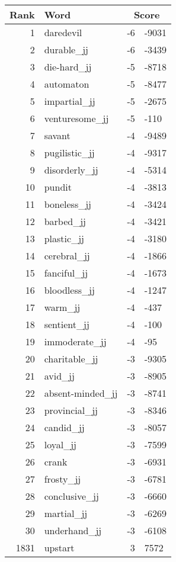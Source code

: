 \begin{longtable}[!htbp]{| rlr@{.}l |}
    \hline
    \textbf{Rank} & \textbf{Word} & \multicolumn{2}{c|}{\textbf{Score}} \\
    \hline
    \endhead
    1 & daredevil & -6 & -9031 \\
    2 & durable\_jj & -6 & -3439 \\
    3 & die-hard\_jj & -5 & -8718 \\
    4 & automaton & -5 & -8477 \\
    5 & impartial\_jj & -5 & -2675 \\
    6 & venturesome\_jj & -5 & -110 \\
    7 & savant & -4 & -9489 \\
    8 & pugilistic\_jj & -4 & -9317 \\
    9 & disorderly\_jj & -4 & -5314 \\
    10 & pundit & -4 & -3813 \\
    11 & boneless\_jj & -4 & -3424 \\
    12 & barbed\_jj & -4 & -3421 \\
    13 & plastic\_jj & -4 & -3180 \\
    14 & cerebral\_jj & -4 & -1866 \\
    15 & fanciful\_jj & -4 & -1673 \\
    16 & bloodless\_jj & -4 & -1247 \\
    17 & warm\_jj & -4 & -437 \\
    18 & sentient\_jj & -4 & -100 \\
    19 & immoderate\_jj & -4 & -95 \\
    20 & charitable\_jj & -3 & -9305 \\
    21 & avid\_jj & -3 & -8905 \\
    22 & absent-minded\_jj & -3 & -8741 \\
    23 & provincial\_jj & -3 & -8346 \\
    24 & candid\_jj & -3 & -8057 \\
    25 & loyal\_jj & -3 & -7599 \\
    26 & crank & -3 & -6931 \\
    27 & frosty\_jj & -3 & -6781 \\
    28 & conclusive\_jj & -3 & -6660 \\
    29 & martial\_jj & -3 & -6269 \\
    30 & underhand\_jj & -3 & -6108 \\
    1831 & upstart & 3 & 7572 \\

\end{longtable}
